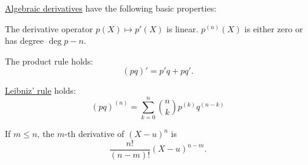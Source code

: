 \begin{proposition}\label{thm:def:algebraic_derivative}
  \hyperref[def:algebraic_derivative]{Algebraic derivatives} have the following basic properties:
  \begin{thmenum}
     The derivative operator \( p(X) \mapsto p'(X) \) is linear.
     \( p^{(n)}(X) \) is either zero or has degree \( \deg p - n \).

     The product rule holds:
    \begin{equation}\label{eq:thm:def:algebraic_derivative/product}
      (pq)' = p'q + pq'.
    \end{equation}

     \hyperref[thm:leibniz_rule]{Leibniz' rule} holds:
    \begin{equation}\label{eq:thm:def:algebraic_derivative/leibniz}
      (pq)^{(n)} = \sum_{k=0}^n \binom n k p^{(k)} q^{(n-k)}
    \end{equation}

     If \( m \leq n \), the \( m \)-th derivative of \( (X - u)^n \) is
    \begin{equation*}
      \frac {n!} {(n-m)!} (X - u)^{n-m}.
    \end{equation*}
  \end{thmenum}
\end{proposition}
